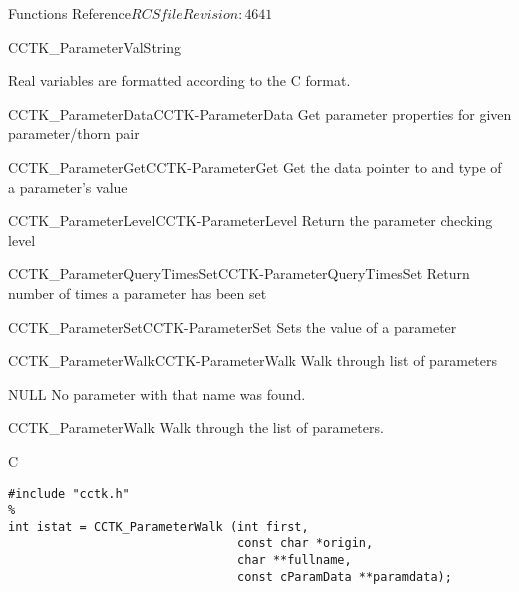 \begin{cactuspart}{ Functions Reference}{$RCSfile$}{$Revision: 4641 $}
\begin{FunctionDescription}{CCTK\_ParameterValString}
\begin{Discussion}
Real variables are formatted according to the C  format.
\end{Discussion}

\begin{SeeAlsoSection}
\begin{SeeAlso2}{CCTK\_ParameterData}{CCTK-ParameterData}
  Get parameter properties for given parameter/thorn pair
\end{SeeAlso2}
\begin{SeeAlso2}{CCTK\_ParameterGet}{CCTK-ParameterGet}
  Get the data pointer to and type of a parameter's value
\end{SeeAlso2}
\begin{SeeAlso2}{CCTK\_ParameterLevel}{CCTK-ParameterLevel}
  Return the parameter checking level
\end{SeeAlso2}
\begin{SeeAlso2}{CCTK\_ParameterQueryTimesSet}{CCTK-ParameterQueryTimesSet}
  Return number of times a parameter has been set
\end{SeeAlso2}
\begin{SeeAlso2}{CCTK\_ParameterSet}{CCTK-ParameterSet}
  Sets the value of a parameter
\end{SeeAlso2}
\begin{SeeAlso2}{CCTK\_ParameterWalk}{CCTK-ParameterWalk}
  Walk through list of parameters
\end{SeeAlso2}
\end{SeeAlsoSection}

\begin{ErrorSection}
\begin{Error}{NULL}
No parameter with that name was found.
\end{Error}
\end{ErrorSection}
\end{FunctionDescription}


\begin{FunctionDescription}{CCTK\_ParameterWalk}
\label{CCTK-ParameterWalk}
Walk through the list of parameters.

\begin{SynopsisSection}
\begin{Synopsis}{C}
\begin{verbatim}
#include "cctk.h"
%
int istat = CCTK_ParameterWalk (int first,
                                const char *origin,
                                char **fullname,
                                const cParamData **paramdata);
\end{verbatim}
\end{Synopsis}
\end{SynopsisSection}


\end{FunctionDescription}
\end{cactuspart}
